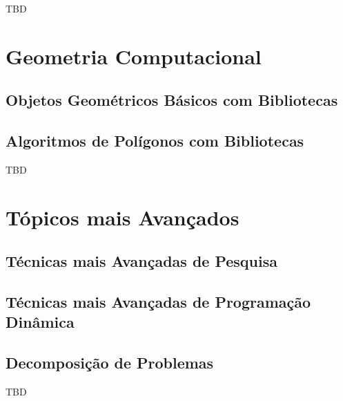 \documentclass[11pt]{scrartcl}
\begin{document}
TBD


\section{Geometria Computacional}

\subsection{Objetos Geométricos Básicos com Bibliotecas}

\subsection{Algoritmos de Polígonos com Bibliotecas}

TBD


\section{Tópicos mais Avançados}

\subsection{Técnicas mais Avançadas de Pesquisa}

\subsection{Técnicas mais Avançadas de Programação Dinâmica}

\subsection{Decomposição de Problemas}

TBD
\end{document}
